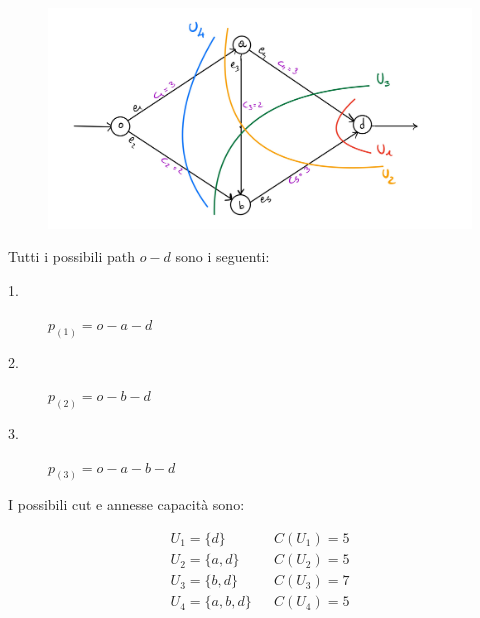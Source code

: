 \documentclass[11pt,largemargins]{homework}
\begin{document}
\maketitle

\section{}%
  
  \begin{figure}[htb]\centering
    \includegraphics[scale=0.17]{ES1_Fig1.jpg}
  \end{figure}
  Tutti i possibili path \(o-d\) sono i seguenti:

  \begin{description}
    \item[1.] \(p_{(1)}= o -a-d\)
    \item[2.] \(p_{(2)}=o-b-d\) 
    \item[3.] \(p_{(3)}= o-a-b-d\) 
  \end{description}

  I possibili cut e annesse capacità sono:

  \begin{align*}
    U_1 = \{d\}\  && C(U_1)=5 \\
    U_2 = \{a, d\} && C(U_2)=5 \\
    U_3 = \{b,d\} && C(U_3)=7 \\
    U_4 = \{a,b,d\} && C(U_4)=5
  \end{align*}
  
\end{document}
